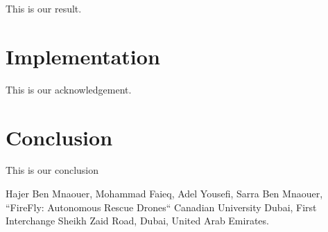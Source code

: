 \documentclass[conference]{IEEEtran}
\begin{document}
This is our result.

\section*{Implementation}

This is our acknowledgement.

\section*{Conclusion}

This is our conclusion


\begin{thebibliography}{00}
 Hajer Ben Mnaouer, Mohammad Faieq, Adel Yousefi, Sarra Ben Mnaouer, ``FireFly: Autonomous Rescue Drones`` Canadian University Dubai, First Interchange Sheikh Zaid Road, Dubai, United Arab Emirates.
\end{thebibliography}
\end{document}
